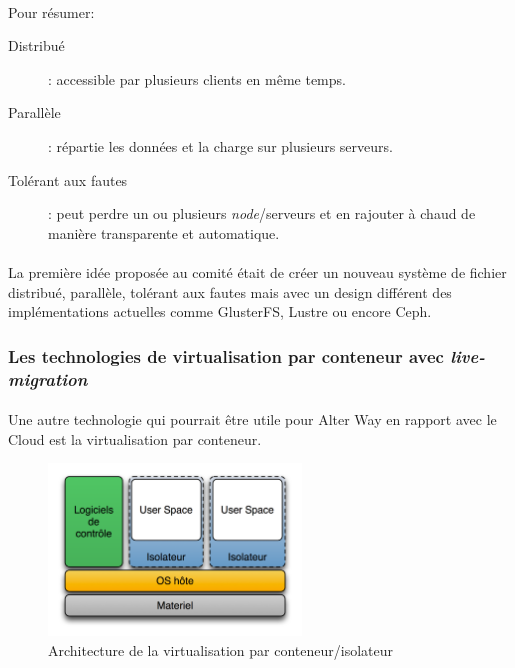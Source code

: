 \paragraph*{}
Pour résumer:
\begin{description}
	\item[Distribué] : accessible par plusieurs clients en même temps.
	\item[Parallèle] : répartie les données et la charge sur plusieurs serveurs.
	\item[Tolérant aux fautes]: peut perdre un ou plusieurs \emph{node}/serveurs et en rajouter à chaud de manière transparente et automatique.
\end{description}

\paragraph*{}
La première idée proposée au comité était de créer un nouveau système de fichier distribué, parallèle, tolérant aux fautes mais avec un design différent des implémentations actuelles
comme GlusterFS, Lustre ou encore Ceph.


\subsubsection{Les technologies de virtualisation par conteneur avec \emph{live-migration}}
\paragraph*{}
Une autre technologie qui pourrait être utile pour Alter Way en rapport avec le Cloud est la virtualisation par conteneur.

\begin{figure}[H]
\centering
\includegraphics[width=0.6\textwidth]{resource/img/Diagramme_ArchiIsolateur}
\caption{Architecture de la virtualisation par conteneur/isolateur}
\end{figure}

